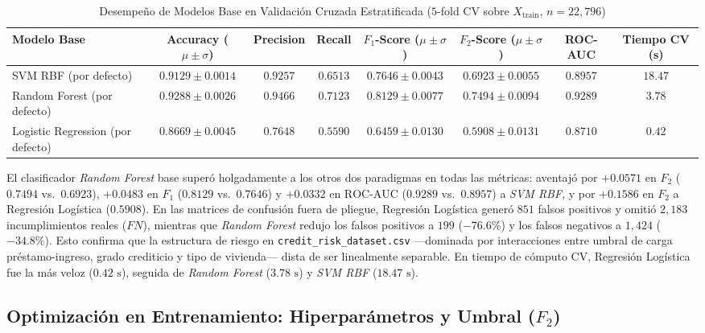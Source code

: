 \documentclass[conference]{IEEEtran}
\begin{document}
\begin{table}[t]
\centering
\scriptsize
\setlength{\tabcolsep}{4.5pt}
\caption{Desempeño de Modelos Base en Validación Cruzada Estratificada ($5$-fold CV sobre $X_{\text{train}}$, $n=22{,}796$)}
\label{tab:baseline_cv}
\begin{tabular}{@{}lccccccc@{}}
\toprule
\textbf{Modelo Base} & \textbf{Accuracy ($\mu \pm \sigma$)} & \textbf{Precision} & \textbf{Recall} & \textbf{$F_1$-Score ($\mu \pm \sigma$)} & \textbf{$F_2$-Score ($\mu \pm \sigma$)} & \textbf{ROC-AUC} & \textbf{Tiempo CV (s)} \\
\midrule
SVM RBF (por defecto) & $0.9129 \pm 0.0014$ & $0.9257$ & $0.6513$ & $0.7646 \pm 0.0043$ & $0.6923 \pm 0.0055$ & $0.8957$ & $18.47$ \\
Random Forest (por defecto) & $\mathbf{0.9288 \pm 0.0026}$ & $\mathbf{0.9466}$ & $\mathbf{0.7123}$ & $\mathbf{0.8129 \pm 0.0077}$ & $\mathbf{0.7494 \pm 0.0094}$ & $\mathbf{0.9289}$ & $3.78$ \\
Logistic Regression (por defecto) & $0.8669 \pm 0.0045$ & $0.7648$ & $0.5590$ & $0.6459 \pm 0.0130$ & $0.5908 \pm 0.0131$ & $0.8710$ & $\mathbf{0.42}$ \\
\bottomrule
\end{tabular}
\end{table}

El clasificador \textit{Random Forest} base superó holgadamente a los otros dos paradigmas en todas las métricas: aventajó por $+0.0571$ en $F_2$ ($0.7494$ vs.\ $0.6923$), $+0.0483$ en $F_1$ ($0.8129$ vs.\ $0.7646$) y $+0.0332$ en $\text{ROC-AUC}$ ($0.9289$ vs.\ $0.8957$) a \textit{SVM RBF}, y por $+0.1586$ en $F_2$ a Regresión Logística ($0.5908$). En las matrices de confusión fuera de pliegue, Regresión Logística generó $851$ falsos positivos y omitió $2{,}183$ incumplimientos reales ($FN$), mientras que \textit{Random Forest} redujo los falsos positivos a $199$ ($-76.6\%$) y los falsos negativos a $1{,}424$ ($-34.8\%$). Esto confirma que la estructura de riesgo en \texttt{credit\_risk\_dataset.csv} —dominada por interacciones entre umbral de carga préstamo-ingreso, grado crediticio y tipo de vivienda— dista de ser linealmente separable. En tiempo de cómputo CV, Regresión Logística fue la más veloz ($0.42\text{ s}$), seguida de \textit{Random Forest} ($3.78\text{ s}$) y \textit{SVM RBF} ($18.47\text{ s}$).

\subsection{Optimización en Entrenamiento: Hiperparámetros y Umbral (\texorpdfstring{$F_2$}{F2})}
\end{document}
